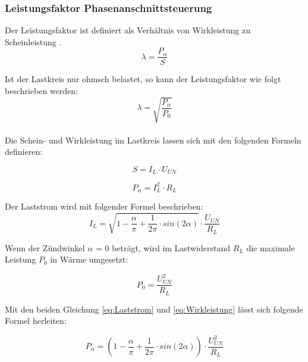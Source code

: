 \subsubsection{Leistungsfaktor Phasenanschnittsteuerung}\label{sec:Leistungsfaktor_Phasenanschnittsteuerung}
Der Leistungsfaktor ist definiert als Verhältnis von Wirkleistung zu Scheinleistung \cite{Leistungselektronik}. 
\begin{equation}\label{eq:lamda_p}
\lambda = \frac{P_{\alpha}}{S}
\end{equation}

Ist der Lastkreis nur ohmsch belastet, so kann der Leistungsfaktor wie folgt beschrieben werden:
\begin{equation}\label{eq:lamda_ohmisch belastet}
\lambda =\sqrt{\frac{P_{\alpha}}{P_{0}}} 
\end{equation}
\\
Die Schein- und Wirkleistung im Lastkreis lassen sich mit den folgenden Formeln definieren:

\begin{equation}\label{eq:Scheinleistung}
S = I_L \cdot U_{UN}   
\end{equation}

\begin{equation}\label{eq:Wirkleistung}
 P_{\alpha} = I_L^2 \cdot R_L    
\end{equation}

Der Laststrom wird mit folgender Formel beschrieben:
\begin{equation}\label{eq:Laststrom}
I_L = \sqrt{1-\frac{\alpha}{\pi}+\frac{1}{2\pi} \cdot sin(2\alpha)} \cdot \frac{U_{UN}}{R_L}
\end{equation}

Wenn der Zündwinkel $\alpha$ = 0 beträgt, wird im Lastwiderstand $R_L$ die maximale Leistung $P_0$ in Wärme umgesetzt:

\begin{equation}\label{eq:Wirkleistung_bei_maximaler_alpha=0}
P_{0} = \frac{ U_{UN}^2}{R_L}  
\end{equation}

Mit den beiden Gleichung \ref{eq:Laststrom} und \ref{eq:Wirkleistung} lässt sich folgende Formel herleiten:

\begin{equation}\label{eq:p_alpha_neu}
P_{\alpha} = \left(1-\frac{\alpha}{\pi}+\frac{1}{2\pi} \cdot sin(2\alpha)\right)  \cdot \frac{U_{UN}^2}{R_L}
\end{equation}
 

